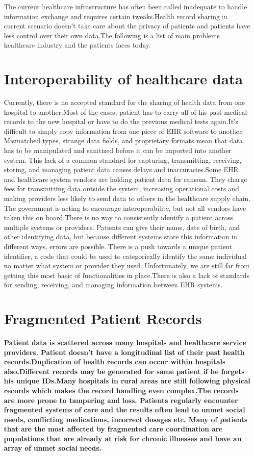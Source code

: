 \documentclass[12pt]{report}
\begin{document}
The current healthcare infrastructure has often been called inadequate to handle information exchange and requires certain tweaks.Health record sharing in current scenario doesn't take care about the privacy of patients and patients have less control over their own data.The following is a list of main problems healthcare industry and the patients faces today.
\section{Interoperability of healthcare data}
Currently, there is no accepted standard for the sharing of health data from one hospital to another.Most of the cases, patient has to carry all of his past medical records to the new hospital or have to do the previous medical tests again.It’s difficult to simply copy information from one piece of EHR software to another. Mismatched types, strange data fields, and proprietary formats mean that data has to be manipulated and sanitized before it can be imported into another system. This lack of a common standard for capturing, transmitting, receiving, storing, and managing patient data causes delays and inaccuracies.Some EHR and healthcare system vendors are holding patient data for ransom. They charge fees for transmitting data outside the system, increasing operational costs and making providers less likely to send data to others in the healthcare supply chain. The government is acting to encourage interoperability, but not all vendors have taken this on board.There is no way to consistently identify a patient across multiple systems or providers. Patients can give their name, date of birth, and other identifying data, but because different systems store this information in different ways, errors are possible. There is a push towards a unique patient identifier, a code that could be used to categorically identify the same individual no matter what system or provider they used. Unfortunately, we are still far from getting this most basic of functionalities in place.There is also a lack of standards for sending, receiving, and managing information between EHR systems.

\section{Fragmented Patient Records}
\paragraph{Patient data is scattered across many hospitals and healthcare service  providers. Patient doesn't have a longitudinal list of their past health records.Duplication of health records can occur within hospitals also.Different records may be generated for same patient if he forgets his unique IDs.Many hospitals in rural areas are still following physical records which makes the record handling even complex.The records are more prone to tampering and loss.
Patients regularly encounter fragmented systems of care and the results often lead to unmet social needs, conflicting medications, incorrect dosages etc. Many of patients that are the most affected by fragmented care coordination are populations that are already at risk for chronic illnesses and have an array of unmet social needs. }
\end{document}
